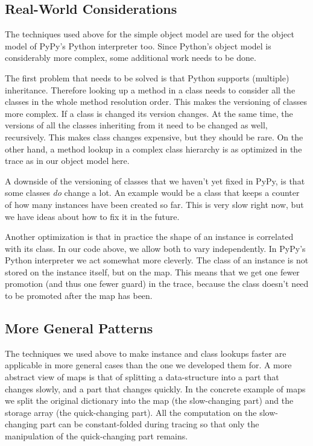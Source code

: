 \documentclass{sig-alternate}
\begin{document}

\subsection{Real-World Considerations}

The techniques used above for the simple object model are used for the object
model of PyPy's Python interpreter too. Since Python's object model is
considerably more complex, some additional work needs to be done.

The first problem that needs to be solved is that Python supports (multiple)
inheritance. Therefore looking up a method in a class needs to consider all the
classes in the
whole method resolution order. This makes the versioning of classes more
complex. If a class is changed its version changes. At the same time, the
versions of all the classes inheriting from it need to be changed as well,
recursively. This makes class changes expensive, but they should be rare.  On the
other hand, a method lookup in a complex class hierarchy is as optimized in the
trace as in our object model here.

A downside of the versioning of classes that we haven't yet fixed in PyPy, is
that some classes \emph{do} change a lot. An example would be a class that keeps a
counter of how many instances have been created so far. This is very slow right
now, but we have ideas about how to fix it in the future.

Another optimization is that in practice the shape of an instance is correlated
with its class. In our code above, we allow both to vary independently.
In PyPy's Python interpreter we act somewhat more cleverly. The class of
an instance is not stored on the instance itself, but on the map. This means
that we get one fewer promotion (and thus one fewer guard) in the trace,
because the class doesn't need to
be promoted after the map has been.



\subsection{More General Patterns}

The techniques we used above to make instance and class lookups faster are
applicable in more general cases than the one we developed them for. A more
abstract view of maps is that of splitting a data-structure into a part that
changes slowly, and a part that changes quickly. In the concrete example of maps
we split the original dictionary into the map (the slow-changing part) and the
storage array (the quick-changing part). All the computation on the
slow-changing part can be constant-folded during tracing so that only the
manipulation of the quick-changing part remains.
\end{document}
